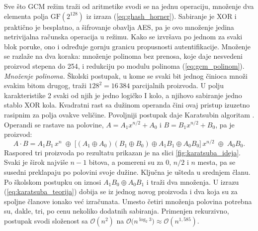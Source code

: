 Sve što GCM režim traži od aritmetike svodi se na jednu operaciju, množenje dva elementa polja $\mathrm{GF}(2^{128})$ iz izraza (\ref{eq:ghash_horner}). Sabiranje je XOR i praktično je besplatno, a šifrovanje obavlja AES, pa je ovo množenje jedina netrivijalna računska operacija u režimu. Kako se izvršava po jednom za svaki blok poruke, ono i određuje gornju granicu propusnosti autentifikacije.
\smallbreak
Množenje se razlaže na dva koraka: množenje polinoma bez prenosa, koje daje nesvedeni proizvod stepena do 254, i redukciju po modulu polinoma (\ref{eq:gcm_polinom}).
\smallbreak
\textit{Množenje polinoma.} Školski postupak, u kome se svaki bit jednog činioca množi svakim bitom drugog, traži $128^2 = 16\,384$ parcijalnih proizvoda. U polju karakteristike 2 svaki od njih je jedno logičko I kolo, a njihovo sabiranje jedno stablo XOR kola. Kvadratni rast sa dužinom operanda čini ovaj pristup izuzetno rasipnim za polja ovakve veličine.
\smallbreak
Povoljniji postupak daje Karatsubin algoritam \cite{karatsuba1962}. Operandi se rastave na polovine, $A = A_1 x^{n/2} + A_0$ i $B = B_1 x^{n/2} + B_0$, pa je proizvod:
\begin{equation}
    A \cdot B = A_1B_1\, x^{n} \;\oplus\; \big[(A_1 \oplus A_0)(B_1 \oplus B_0) \oplus A_1B_1 \oplus A_0B_0\big]\, x^{n/2} \;\oplus\; A_0B_0.
    \label{eq:karatsuba_teorija}
\end{equation}
Raspored tri proizvoda po rezultatu prikazan je na slici \ref{fig:karatsuba_ideja}. Svaki je širok najviše $n-1$ bitova, a pomereni su za $0$, $n/2$ i $n$ mesta, pa se susedni preklapaju po polovini svoje dužine. Ključna je ušteda u srednjem članu. Po školskom postupku on iznosi $A_1B_0 \oplus A_0B_1$ i traži dva množenja. U izrazu (\ref{eq:karatsuba_teorija}) dobija se iz jednog novog proizvoda i dva koja su za spoljne članove ionako već izračunata. Umesto četiri množenja polovina potrebna su, dakle, tri, po cenu nekoliko dodatnih sabiranja.
\smallbreak
Primenjen rekurzivno, postupak svodi složenost sa $\mathcal{O}(n^2)$ na $\mathcal{O}\big(n^{\log_2 3}\big) \approx \mathcal{O}(n^{1{,}585})$.

